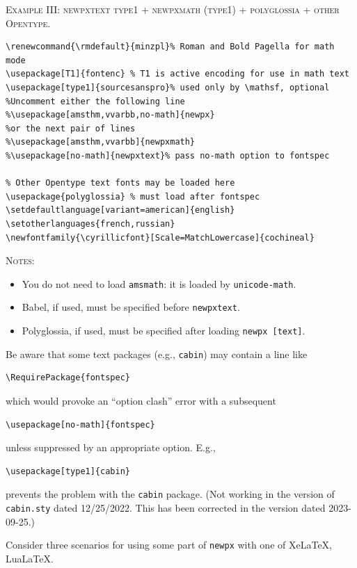 \documentclass[11pt]{article}
\theoremstyle{oldplain}
\theoremstyle{plain}
\begin{document}
\textsc{Example III: newpxtext type1 + newpxmath (type1) + polyglossia + other Opentype.}
\begin{verbatim}
\renewcommand{\rmdefault}{minzpl}% Roman and Bold Pagella for math mode
\usepackage[T1]{fontenc} % T1 is active encoding for use in math text
\usepackage[type1]{sourcesanspro}% used only by \mathsf, optional
%Uncomment either the following line
%\usepackage[amsthm,vvarbb,no-math]{newpx}
%or the next pair of lines
%\usepackage[amsthm,vvarbb]{newpxmath}
%\usepackage[no-math]{newpxtext}% pass no-math option to fontspec

% Other Opentype text fonts may be loaded here
\usepackage{polyglossia} % must load after fontspec
\setdefaultlanguage[variant=american]{english}
\setotherlanguages{french,russian}
\newfontfamily{\cyrillicfont}[Scale=MatchLowercase]{cochineal}
\end{verbatim}
\textsc{Notes:}
\begin{itemize}
\item
You do not need to load {\tt amsmath}: it is loaded by {\tt unicode-math}.
\item Babel, if used, must be specified before {\tt newpxtext}.
\item Polyglossia, if used, must be specified after loading {\tt newpx [text]}.
\end{itemize}


Be aware that some text packages (e.g., {\tt cabin}) may contain a line like
\begin{verbatim}
\RequirePackage{fontspec}
\end{verbatim}
which would provoke an ``option clash'' error with  a subsequent 
\begin{verbatim}
\usepackage[no-math]{fontspec}
\end{verbatim}
unless suppressed by an appropriate option. E.g., 
\begin{verbatim}
\usepackage[type1]{cabin}
\end{verbatim}
prevents the problem with the {\tt cabin} package. (Not working in the version of {\tt cabin.sty} dated 12/25/2022. This has been corrected in the version dated 2023-09-25.)

\iffalse
 Consider three scenarios for using some part of {\tt newpx} with one of XeLaTeX, LuaLaTeX.
\end{document}
